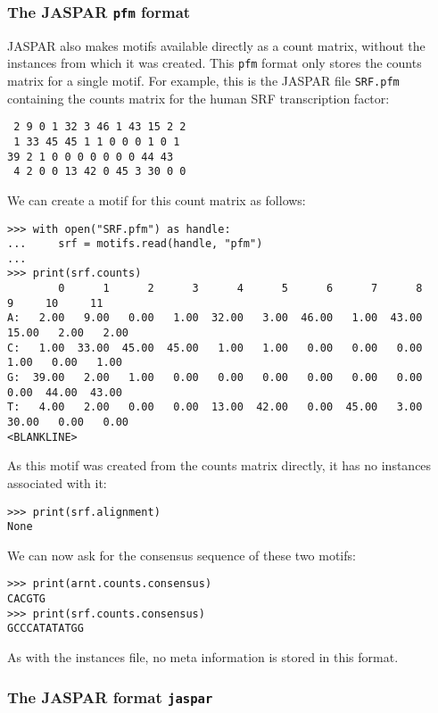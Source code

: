 \subsubsection*{The JASPAR \texttt{pfm} format}

JASPAR also makes motifs available directly as a count matrix,
without the instances from which it was created. This \verb+pfm+ format only
stores the counts matrix for a single motif.
For example, this is the JASPAR file \verb+SRF.pfm+ containing the counts matrix for the human SRF transcription factor:
\begin{verbatim}
 2 9 0 1 32 3 46 1 43 15 2 2
 1 33 45 45 1 1 0 0 0 1 0 1
39 2 1 0 0 0 0 0 0 0 44 43
 4 2 0 0 13 42 0 45 3 30 0 0
\end{verbatim}
We can create a motif for this count matrix as follows:

\begin{verbatim}
>>> with open("SRF.pfm") as handle:
...     srf = motifs.read(handle, "pfm")
...
>>> print(srf.counts)
        0      1      2      3      4      5      6      7      8      9     10     11
A:   2.00   9.00   0.00   1.00  32.00   3.00  46.00   1.00  43.00  15.00   2.00   2.00
C:   1.00  33.00  45.00  45.00   1.00   1.00   0.00   0.00   0.00   1.00   0.00   1.00
G:  39.00   2.00   1.00   0.00   0.00   0.00   0.00   0.00   0.00   0.00  44.00  43.00
T:   4.00   2.00   0.00   0.00  13.00  42.00   0.00  45.00   3.00  30.00   0.00   0.00
<BLANKLINE>
\end{verbatim}
As this motif was created from the counts matrix directly, it has no instances associated with it:

\begin{verbatim}
>>> print(srf.alignment)
None
\end{verbatim}
We can now ask for the consensus sequence of these two motifs:

\begin{verbatim}
>>> print(arnt.counts.consensus)
CACGTG
>>> print(srf.counts.consensus)
GCCCATATATGG
\end{verbatim}

As with the instances file, no meta information is stored in this format.

\subsubsection*{The JASPAR format \texttt{jaspar}}

